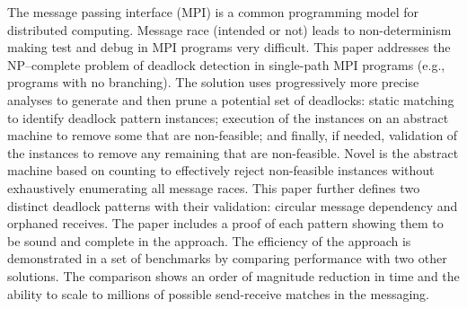 The message passing interface (MPI) is a common programming model for distributed computing. Message race (intended or not) leads to non-determinism making test and debug in MPI programs very difficult. This paper addresses the NP--complete problem of deadlock detection in single-path MPI programs (e.g., programs with no branching). The solution uses progressively more precise analyses to generate and then prune a potential set of deadlocks: static matching to identify deadlock pattern instances; execution of the instances on an abstract machine to remove some that are non-feasible; and finally, if needed, validation of the instances to remove any remaining that are non-feasible. Novel is the abstract machine based on counting to effectively reject non-feasible instances without exhaustively enumerating all message races. This paper further defines two distinct deadlock patterns with their validation: circular message dependency and orphaned receives. The paper includes a proof of each pattern showing them to be sound and complete in the approach. The efficiency of the approach is demonstrated in a set of benchmarks by comparing performance with two other solutions. The comparison shows an order of magnitude reduction in time and the ability to scale to millions of possible send-receive matches in the messaging.
